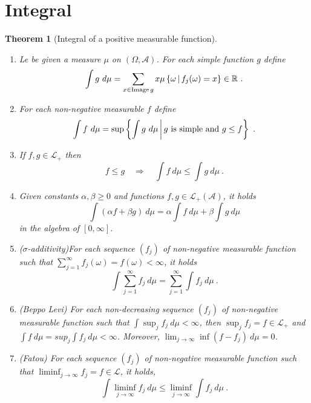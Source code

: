 \documentclass[12pt,a4paper]{amsart}
\theoremstyle{plain}
\newtheorem{theorem}{Theorem}%
\theoremstyle{definition}
\theoremstyle{remark}
\begin{document}
\section{Integral}
\label{sec:integrals}

\begin{theorem}[Integral of a positive measurable function]\ 
\begin{enumerate}
\item Le be given a measure $\mu$ on $(\Omega,\mathcal A)$.  For each
  simple function $g$ define
  \begin{equation*}
    \int g \ d\mu = \sum_{x \in
      \operatorname{Image} g} x \mu\left\{\omega \, \middle| \, f_j(\omega) = x \right\}
    \in \mathbb{R} \ .  
  \end{equation*}
\item For each non-negative measurable $f$ define
  \begin{equation*}
    \int f \ d\mu = \sup \setof{\int g \ d\mu}{\text{$g$ is simple and
      $g \leq f$}} \ .
  \end{equation*}
\item If $f, g \in \mathcal L_+$ then
  \begin{equation*}
    f \leq g \quad \Rightarrow \quad \int f \ d\mu \leq \int g \ d\mu \ .
  \end{equation*}
\item Given constants $\alpha,\beta \geq 0$ and functions $f,g \in
  \mathcal L_+(\mathcal A)$, it holds
  \begin{equation*}
    \int (\alpha f + \beta g) \ d\mu = \alpha \int f \ d\mu + \beta
    \int g \ d\mu
  \end{equation*}
in the algebra of $[0,\infty]$. 
\item (\emph{$\sigma$-additivity})For each sequence $(f_j)$ of non-negative measurable function such that $\sum_{j=1}^\infty f_j(\omega) = f(\omega) < \infty$, 
  it holds
  \begin{equation*}
    \int \sum_{j=1}^\infty f_j \ d\mu = \sum_{j=1}^\infty  \int f_j \ d\mu \ .
  \end{equation*}
\item (\emph{Beppo Levi}) For each non-decreasing sequence $(f_j)$ of non-negative measurable function
  such that $\int \sup_{j} f_j \ d\mu < \infty$, then $\sup_j f_j = f
  \in \mathcal L_+$ and $\int f \ d\mu = sup_j \int f_j \ d\mu <
  \infty$. Moreover, $\lim_{j \to \infty} \inf (f - f_j) \ d\mu = 0$.  
\item (\emph{Fatou}) For each sequence $(f_j)$ of non-negative measurable function
  such that $\liminf_{j\to\infty} f_j = f \in \mathcal L$, it  holds,
  \begin{equation*}
    \int \liminf_{j \to \infty} f_j \ d\mu \leq \liminf_{j \to \infty}
    \int f_j \ d\mu \ .
  \end{equation*}
\end{enumerate}
\end{theorem}
\end{document}
